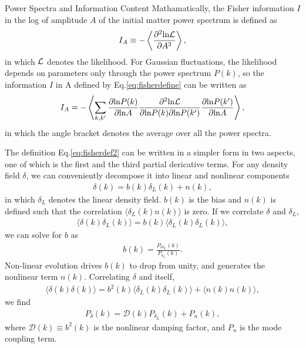 \begin{section}{Power Spectra and Information Content}
Mathamatically, the Fisher information \cite{bib:Tegmark1997} $I$ in the log 
of amplitude $A$ of the initial matter power spectrum is defined as 
\begin{align}
   I_A \equiv -\left\langle \frac{\partial ^2 \mathrm{ln \mathcal{L}}}{\partial A ^2}\right\rangle,
\label{eq:fisherdefine}
\end{align}
   in which $\mathcal{L}$ denotes the likelihood. 
For Gaussian fluctuations, the likelihood depends on parameters only through the 
power spectrum $P(k)$, so the information $I$ in A defined by Eq.\ref{eq:fisherdefine}
can be written as \cite{bib:Rimes2006}
\begin{align}
    I_A = - \left\langle \sum_{k,k'} \frac{\partial \mathrm{ln} P(k)}{\partial \mathrm{ln} A} 
\frac{\partial ^2 \mathrm{ln \mathcal{L}}}{\partial \mathrm{ln} P(k) \partial \mathrm{ln} P(k')}
\frac{\partial \mathrm{ln} P(k')}{\partial \mathrm{ln} A}\right\rangle,
\label{eq:fisherdef2}
\end{align}
in which the angle bracket denotes the average over all the power spectra.

The definition Eq.\ref{eq:fisherdef2} can be written in a simpler form in two 
aspects, one of which is the first and the third partial dericative terms. 
For any density field $\delta$, we can conveniently decompose it into linear 
and nonlinear components
\begin{align}
    \delta (k) = b (k) \delta _L (k) + n (k),
\label{eq:decompose}
\end{align}
in which $\delta_L$ denotes the linear density field. $b (k)$ is the bias and 
$n (k)$ is defined  such that the correlation $\langle \delta_L (k) n (k) \rangle$ 
is zero. 
If we correlate  
$\delta$ and $\delta_L$,
\begin{align}
   \langle \delta (k) \delta_L (k) \rangle = b (k) \langle \delta_L (k) \delta_L (k) \rangle,
\label{eq:correlating}
\end{align} 
    we can solve for $b$ as 
\begin{align}
    b (k) = \frac{P _{\delta \delta_L}(k)}{P_{\delta_L}(k)}.
\label{eq:bofk}
\end{align}
Non-linear evolution drives $b (k)$ to drop from unity, and generates the 
nonlinear term $n (k)$. 
Correlating $\delta$ and itself, 
\begin{align}
  \langle \delta (k) \delta (k) \rangle = 
  b^2 (k) \langle \delta_L (k) \delta_L (k) \rangle + \langle n(k)n(k) \rangle,
\end{align}
we find 
\begin{align}
   P_\delta (k) = \mathcal{D} (k) P_{\delta_L} (k) + P_n (k),
\label{eq:powerdecompose}
\end{align}
where $\mathcal{D}(k) \equiv b^2 (k)$ is the nonlinear damping factor, and 
$P_n$ is the mode coupling term.


\end{section}
